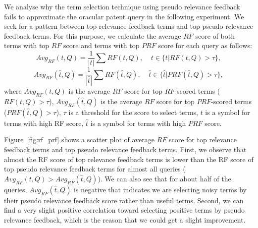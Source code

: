 We analyse why the term selection technique using pseudo relevance feedback fails to approximate the oracular patent query in the following experiment.  
We seek for a pattern between top relevance feedback terms and top pseudo relevance feedback terms. For this purpose, we calculate the average $\mathit{RF}$ score of both terms with top  $\mathit{RF}$ score and terms with top $\mathit{PRF}$ score for each query as follows:
\begin{equation}
Avg_{RF}(t, Q) = \frac{1}{|t|}\sum {RF}(t, Q), \;\;\;\; t\in \{t | RF(t, Q)>\tau\},
\end{equation}
\begin{equation}
Avg_{RF}(\hat{t}, Q) = \frac{1}{|\hat{t}|}\sum {RF}(\hat{t}, Q), \;\;\;\; \hat{t}\in \{\hat{t} | PRF(\hat{t}, Q)>\tau\},
\end{equation}
where $Avg_{RF}(t, Q)$ is the average  $\mathit{RF}$ score for top  $\mathit{RF}$-scored terms ($RF(t, Q)>\tau$), $Avg_{RF}(\hat{t}, Q)$ is the average  $\mathit{RF}$ score for top  $\mathit{PRF}$-scored terms ($PRF(\hat{t}, Q)>\tau$), $\tau$ is a threshold for the score to select terms, $t$ is a symbol for terms with high RF score, $\hat{t}$ is a symbol for terms with high $\mathit{PRF}$ score.

Figure~\ref{fig:rf_prf} shows a scatter plot of average $\mathit{RF}$ score for top relevance feedback terms and top pseudo relevance feedback terms. First, we observe that almost the RF score of top relevance feedback terms is lower than the RF score of top pseudo relevance feedback terms for almost all queries ($ Avg_{RF}(t, Q) > Avg_{RF}(\hat{t}, Q)$). We can also see that for about half of the queries, $Avg_{RF}(\hat{t}, Q)$ is negative that indicates we are selecting noisy terms by their pseudo relevance feedback score rather than useful terms. Second, we can find a very slight positive correlation toward selecting positive terms by pseudo relevance feedback, which is the reason that we could get a slight improvement.  

